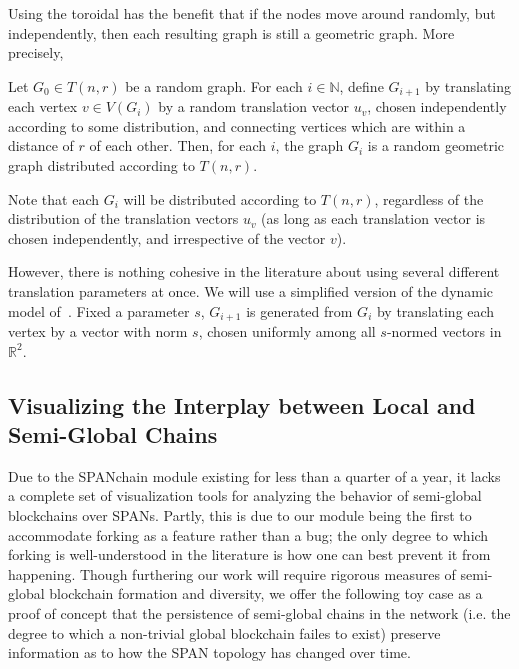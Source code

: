 Using the toroidal has the benefit that
if the nodes move around randomly, but independently,
then each resulting graph is still a geometric graph.
More precisely,

\begin{proposition}
	Let $G_0 \in T(n, r)$ be a random graph.
	For each $i \in \mathbb N$,
	define $G_{i+1}$ by translating each vertex $v \in V(G_i)$
	by a random translation vector $u_v$,
	chosen independently according to some distribution,
	and connecting vertices which are within a distance of $r$ of each other.
	Then, for each $i$,
	the graph $G_i$ is a random geometric graph distributed according to $T(n, r)$.
\end{proposition}

Note that each $G_i$ will be distributed according to $T(n, r)$,
regardless of the distribution of the translation vectors $u_v$
(as long as each translation vector is chosen independently,
and irrespective of the vector $v$).


However,
there is nothing cohesive in the literature about using several different
translation parameters at once.
We will use a simplified version of the dynamic model of~\cite{Diaz2008}.
Fixed a parameter $s$,
$G_{i+1}$ is generated from $G_i$
by translating each vertex by a vector with norm $s$,
chosen uniformly among all $s$-normed vectors in $\mathbb R^2$.


\subsection{Visualizing the Interplay between Local and Semi-Global Chains}
Due to the SPANchain module existing for less than a quarter of a year, it
lacks a complete set of visualization tools for analyzing the
behavior of semi-global blockchains over SPANs. Partly, this is due to
our module being the first to accommodate forking as a feature rather than
a bug; the only degree to which forking is well-understood in the literature
is how one can best prevent it from happening. Though furthering our work
will require rigorous measures of semi-global blockchain formation and
diversity, we offer the following toy case as a proof of concept that the persistence of
semi-global chains in the network (i.e. the degree to which a non-trivial
global blockchain failes to exist) preserve information as to how the SPAN
topology has changed over time.

